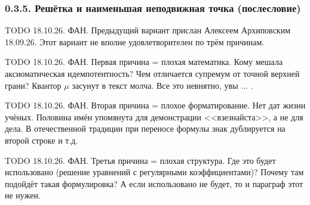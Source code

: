 \documentclass[mathserif,12pt,aspectratio=169]{beamer}
\def\TODO#1{{\color{gray} TODO {#1}}}
\begin{document}
\begin{frame}
\frametitle{0.3.5. Решётка и наименьшая неподвижная точка (послесловие)}

\TODO{ 18.10.26. ФАН. Предыдущий вариант прислан Алексеем Архиповским 18.09.26.
Этот вариант не вполне удовлетворителен по трём причинам.}

\medskip
\TODO{ 18.10.26. ФАН. Первая причина = плохая математика. Кому мешала аксиоматическая идемпотентность?  Чем отличается супремум от точной верхней грани? Квантор $\mu$ засунут в текст молча. Все это невнятно, увы ... .}

\medskip
\TODO{ 18.10.26. ФАН. Вторая причина = плохое форматирование. Нет дат жизни учёных. Половина имён упомянута для демонстрации <<взезнайста>>, а не для дела. В отечественной 
традиции при переносе формулы знак дублируется на второй строке и т.д. }


\medskip
\TODO{ 18.10.26. ФАН. Третья причина = плохая структура. Где это будет использовано
(решение уравнений с регулярными коэффициентами)? 
Почему там подойдёт такая формулировка? А если использовано не будет, 
то и параграф этот не нужен.}


\end{frame}

\end{document}
